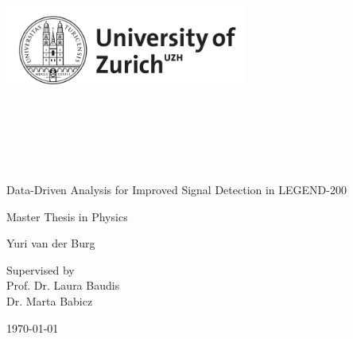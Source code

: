 \clearpage
\thispagestyle{empty}
\begin{center}
    \includegraphics[width=8cm,height=8cm,keepaspectratio]{figures/UZH.png}
    \label{fig:uzh}

	\vspace{2cm}
    \Huge
      Data-Driven Analysis for Improved Signal Detection in LEGEND-200
	\vspace{1.5cm}

    \huge
    Master Thesis in Physics
	\vspace{2cm}

    \Large
      Yuri van der Burg
	  \vspace{2cm}


    \normalsize
    Supervised by \\
    \Large
    Prof. Dr. Laura Baudis \\
    Dr. Marta Babicz \\
	\vspace{2cm}

    \large
    \today
\end{center}
